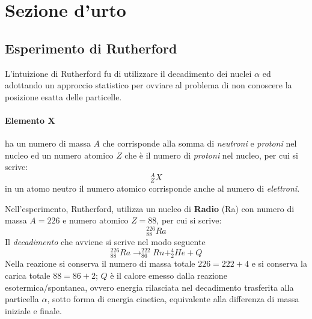 
\section{Sezione d'urto}


\subsection{Esperimento di Rutherford}
L'intuizione di Rutherford fu di utilizzare il decadimento dei nuclei $\alpha$ ed adottando un approccio statistico per ovviare al problema di non conoscere la posizione esatta delle particelle.

\paragraph{Elemento X} ha un numero di massa $A$ che corrisponde alla somma di \emph{neutroni} e \emph{protoni} nel nucleo ed un numero atomico $Z$ che è il numero di \emph{protoni} nel nucleo, per cui si scrive:
$$^{A}_{Z} X$$
in un atomo neutro il numero atomico corrisponde anche al numero di \emph{elettroni}.

Nell'esperimento, Rutherford, utilizza un nucleo di \textbf{Radio} (Ra) con numero di massa $A=226$ e numero atomico $Z=88$, per cui si scrive:
$$^{226}_{88} Ra$$
Il \emph{decadimento} che avviene si scrive nel modo seguente
\begin{equation}
^{226}_{88} Ra \longrightarrow ^{222}_{86}Rn + ^{4}_{2}He + Q
\end{equation}
Nella reazione si conserva il numero di massa totale $ 226 = 222 + 4 $ e si conserva la carica totale $ 88 = 86 + 2 $;
$Q$ è il calore emesso dalla reazione esotermica/spontanea, ovvero energia rilasciata nel decadimento trasferita alla particella $\alpha$, sotto forma di energia cinetica, equivalente alla differenza di massa iniziale e finale.



